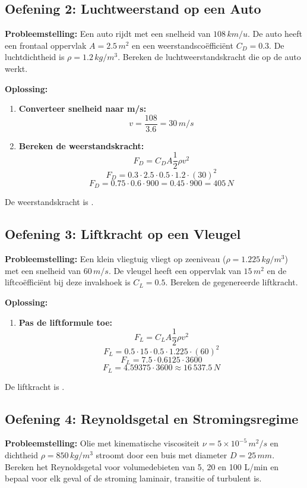 \documentclass[a4paper,11pt,twoside]{report}
\begin{document}
\subsection{Oefening 2: Luchtweerstand op een Auto}
\textbf{Probleemstelling:}
Een auto rijdt met een snelheid van $108 \, km/u$. De auto heeft een frontaal oppervlak $A = 2.5 \, m^2$ en een weerstandscoëfficiënt $C_D = 0.3$. De luchtdichtheid is $\rho = 1.2 \, kg/m^3$.
Bereken de luchtweerstandskracht die op de auto werkt.

\textbf{Oplossing:}
\begin{enumerate}
    \item \textbf{Converteer snelheid naar m/s:}
    \[ v = \frac{108}{3.6} = 30 \, m/s \]
    
    \item \textbf{Bereken de weerstandskracht:}
    \[ F_D = C_D A \frac{1}{2} \rho v^2 \]
    \[ F_D = 0.3 \cdot 2.5 \cdot 0.5 \cdot 1.2 \cdot (30)^2 \]
    \[ F_D = 0.75 \cdot 0.6 \cdot 900 = 0.45 \cdot 900 = 405 \, N \]
\end{enumerate}
De weerstandskracht is .

\subsection{Oefening 3: Liftkracht op een Vleugel}
\textbf{Probleemstelling:}
Een klein vliegtuig vliegt op zeeniveau ($\rho = 1.225 \, kg/m^3$) met een snelheid van $60 \, m/s$. De vleugel heeft een oppervlak van $15 \, m^2$ en de liftcoëfficiënt bij deze invalshoek is $C_L = 0.5$.
Bereken de gegenereerde liftkracht.

\textbf{Oplossing:}
\begin{enumerate}
    \item \textbf{Pas de liftformule toe:}
    \[ F_L = C_L A \frac{1}{2} \rho v^2 \]
    \[ F_L = 0.5 \cdot 15 \cdot 0.5 \cdot 1.225 \cdot (60)^2 \]
    \[ F_L = 7.5 \cdot 0.6125 \cdot 3600 \]
    \[ F_L = 4.59375 \cdot 3600 \approx 16\,537.5 \, N \]
\end{enumerate}
De liftkracht is .

\subsection{Oefening 4: Reynoldsgetal en Stromingsregime}
\textbf{Probleemstelling:}
Olie met kinematische viscositeit $\nu = 5 \times 10^{-5} \, m^2/s$ en dichtheid $\rho = 850 \, kg/m^3$ stroomt door een buis met diameter $D = 25 \, mm$. Bereken het Reynoldsgetal voor volumedebieten van 5, 20 en 100 L/min en bepaal voor elk geval of de stroming laminair, transitie of turbulent is.
\end{document}
